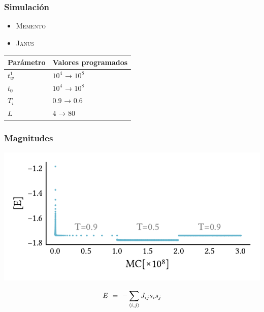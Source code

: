 \documentclass{beamer}
\begin{document}
\begin{frame}
  \frametitle{Simulación}
  \begin{itemize}
  \item \textsc{Memento}
  \item \textsc{Janus}
  \end{itemize}
  \begin{flushleft}
    \begin{tabular}{ll}
      \toprule
     Parámetro & Valores programados \\
      \midrule
      $t_w^1$ & $10^4$ → $10^8$\\
      $t_0$ & $10^4$ → $10^8$\\
      $T_i$ & $0.9$ → $0.6$ \\
      $L$ & $4$ → $80$ \\
      \bottomrule
    \end{tabular}
  \end{flushleft}
\end{frame}

\begin{frame}
  \frametitle{Magnitudes}
  \pause
  \begin{center}
    \includegraphics{../study_cases/energy_in_protocol/energyprotocol_beamer.pdf}
  \end{center}
    \begin{equation*}
      E \ = \  - \sum_{\expval{i,j}} J_{ij} s_i s_j
    \end{equation*}
\end{frame}
\end{document}
